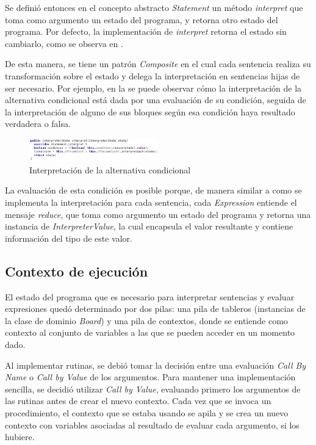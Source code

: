 Se definió entonces en el concepto abstracto \textit{Statement} un método \textit{interpret} que toma como argumento un estado del programa, y retorna otro estado del programa. Por defecto, la implementación de \textit{interpret} retorna el estado sin cambiarlo, como se observa en .




De esta manera, se tiene un patrón \textit{Composite}\cite{Gamma} en el cual cada sentencia realiza su transformación sobre el estado y delega la interpretación en sentencias hijas de ser necesario. Por ejemplo, en la  se puede observar cómo la interpretación de la alternativa condicional está dada por una evaluación de su condición, seguida de la interpretación de alguno de sus bloques según esa condición haya resultado verdadera o falsa.

\begin{figure}[hb]
\centering
\includegraphics[width=0.5\textwidth]{assets/behavior_ifElse}
\caption{Interpretación de la alternativa condicional}
\label{fig:behavior_ifElse}
\end{figure}

La evaluación de esta condición es posible porque, de manera similar a como se implementa la interpretación para cada sentencia, cada \textit{Expression} entiende el mensaje \textit{reduce}, que toma como argumento un estado del programa y retorna una instancia de \textit{InterpreterValue}, la cual encapsula el valor resultante y contiene información del tipo de este valor. 

\subsection{Contexto de ejecución}

El estado del programa que es necesario para interpretar sentencias y evaluar expresiones quedó determinado por dos pilas: una pila de tableros (instancias de la clase de dominio \textit{Board}) y una pila de contextos, donde se entiende como contexto al conjunto de variables a las que se pueden acceder en un momento dado.

Al implementar rutinas, se debió tomar la decisión entre una evaluación \textit{Call By Name} o \textit{Call by Value}\cite{DowekL11} de los argumentos. Para mantener una implementación sencilla, se decidió utilizar \textit{Call by Value}, evaluando primero los argumentos de las rutinas antes de crear el nuevo contexto. 
Cada vez que se invoca un procedimiento, el contexto que se estaba usando se apila y se crea un nuevo contexto con variables asociadas al resultado de evaluar cada argumento, si los hubiere. 

